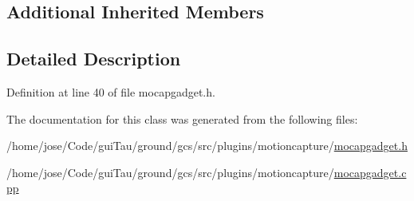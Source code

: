 \subsection*{Additional Inherited Members}


\subsection{Detailed Description}


Definition at line 40 of file mocapgadget.\-h.



The documentation for this class was generated from the following files\-:\begin{DoxyCompactItemize}
\item 
/home/jose/\-Code/gui\-Tau/ground/gcs/src/plugins/motioncapture/\hyperlink{mocapgadget_8h}{mocapgadget.\-h}\item 
/home/jose/\-Code/gui\-Tau/ground/gcs/src/plugins/motioncapture/\hyperlink{mocapgadget_8cpp}{mocapgadget.\-cpp}\end{DoxyCompactItemize}

